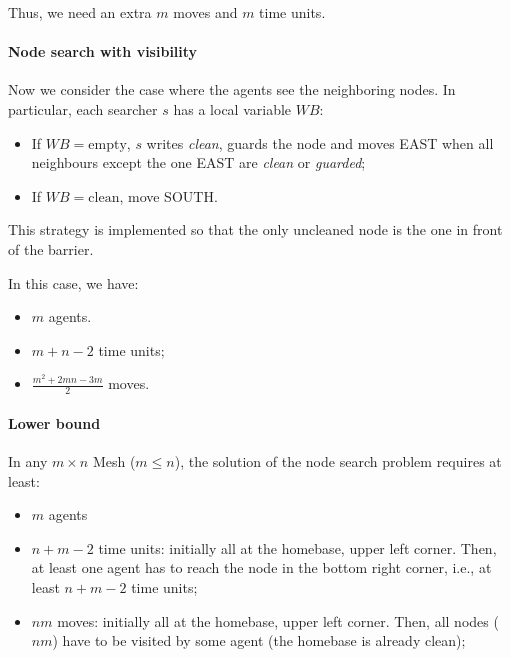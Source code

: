 
Thus, we need an extra $m$ moves and $m$ time units.

\paragraph{Node search with visibility} Now we consider the case where the agents see the neighboring nodes. In particular, each searcher $s$ has a local variable $WB$:
\begin{itemize}
    \item If $WB=\text{empty}$, $s$ writes \textit{clean}, guards the node and moves EAST when all neighbours except the one EAST are \textit{clean} or \textit{guarded};
    \item If $WB=\text{clean}$, move SOUTH.
\end{itemize}

This strategy is implemented so that the only uncleaned node is the one in front of the barrier.


In this case, we have:
\begin{itemize}
    \item $m$ agents.
    \item $m+n-2$ time units;
    \item $\frac{m^2 + 2mn - 3m}{2}$ moves.
\end{itemize}


\paragraph{Lower bound} In any $m \times n$ Mesh ($m \leq n$), the solution of the node search problem requires at least:
\begin{itemize}
    \item $m$ agents
    \item $n+m-2$ time units: initially all at the homebase, upper left corner. Then, at least one agent has to reach the node in the bottom right corner, i.e., at least $n+m-2$ time units;
    \item $nm$ moves: initially all at the homebase, upper left corner. Then, all nodes ($nm$) have to be visited by some agent (the homebase is already clean);
\end{itemize}

